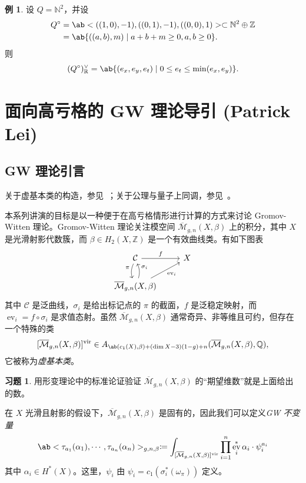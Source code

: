 \documentclass{amsart}
\theoremstyle{definition}
\newtheorem{exm}[thm]{例}
\newtheorem{exer}[thm]{习题}
\theoremstyle{remark}
\theoremstyle{plain}
\theoremstyle{definition}
\theoremstyle{remark}
\newcommand{\N}{\mathbb{N}}
\newcommand{\R}{\mathbb{R}}
\newcommand{\Z}{\mathbb{Z}}
\newcommand{\Q}{\mathbb{Q}}
\newcommand{\Mbar}{\overline{\mathcal{M}}}
\newcommand{\mc}[1]{\mathcal{#1}}
\newcommand{\mr}[1]{\mathrm{#1}}
\newcommand{\on}[1]{\operatorname{#1}}
\newcommand{\1}{\mathbf{1}}
\newcommand{\2}{\mathbf{2}}
\newcommand{\3}{\mathbf{3}}
\newcommand{\vir}{\mr{vir}}
\DeclareMathOperator{\ev}{ev}
\begin{document}
\begin{exm}
    设 \(Q = \N^2\)，并设
    \begin{align*}
        Q^{\circ} &= \ab<((1,0), -1), ((0,1), -1), ((0,0),1)> \subset \N^2 \oplus \Z \\
        &= \ab\{((a,b), m) \mid a+b+m \geq 0, a,b \geq 0 \}.
    \end{align*}
    则
    \[ (Q^{\circ})_{\R}^{\vee} = \ab\{ (e_x, e_y, e_t) \mid 0 \leq e_t \leq \min(e_x, e_y) \}. \]
\end{exm}


\section{面向高亏格的 GW 理论导引 (Patrick Lei)}%
\label{sec:Intro to GW theory with a view to higher genus (Patrick Lei)}


\subsection{GW 理论引言}%
\label{sub:Introduction to GW theory}

关于虚基本类的构造，参见~\cite{BehrendFantechi1997}；关于公理与量子上同调，参见~\cite{KM1994}。

本系列讲演的目标是以一种便于在高亏格情形进行计算的方式来讨论 Gromov-Witten 理论。Gromov-Witten 理论关注模空间 \(\Mbar_{g,n}(X, \beta)\) 上的积分，其中 \(X\) 是光滑射影代数簇，而 \(\beta \in H_2(X, \Z)\) 是一个有效曲线类。有如下图表
\begin{equation*}
\begin{tikzcd}
    \mc{C} \ar{r}{f} \ar[bend right=20]{d}[swap]{\pi} & X \\
    \Mbar_{g,n}(X, \beta) \ar[bend right=20]{u}[swap]{\sigma_i} \ar{ur}[swap]{\on{ev}_i}
\end{tikzcd}
\end{equation*}
其中 \(\mc{C}\) 是泛曲线，\(\sigma_i\) 是给出标记点的 \(\pi\) 的截面，\(f\) 是泛稳定映射，而 \(\ev_i = f \circ \sigma_i\) 是求值态射。虽然 \(\Mbar_{g,n}(X, \beta)\) 通常奇异、非等维且可约，但存在一个特殊的类
\[ [\Mbar_{g,n}(X, \beta)]^{\vir} \in A_{\ab(c_1(X), \beta) + (\dim X - 3)(1-g) + n}(\Mbar_{g,n}(X, \beta), \Q), \]
它被称为\textit{虚基本类}。

\begin{exer}
    用形变理论中的标准论证验证 \(\Mbar_{g,n}(X, \beta)\) 的``期望维数''就是上面给出的数。
\end{exer}

在 \(X\) 光滑且射影的假设下，\(\Mbar_{g,n}(X, \beta)\) 是固有的，因此我们可以定义\textit{GW 不变量}
\[ \ab<\tau_{a_1}(\alpha_1), \cdots, \tau_{a_n}(\alpha_n)>_{g,n,\beta} \coloneqq \int_{[\Mbar_{g,n}(X, \beta)]^{\vir}} \prod_{i=1}^n \ev_i^* \alpha_i \cdot \psi_i^{a_i} \]
其中 \(\alpha_i \in H^*(X)\)。这里，\(\psi_i\) 由 \(\psi_i = c_1(\sigma_i^*(\omega_{\pi}))\) 定义。
\end{document}
